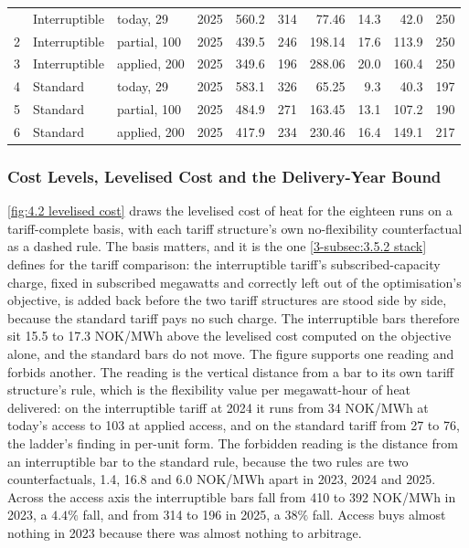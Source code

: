 \begin{table}[htbp]
\begin{tabular}{c l l c r r r r r r}
\addlinespace
1 & Interruptible & today, 29 & 2025 & 560.2 & 314 & 77.46 & 14.3 & 42.0 & 250 \\
2 & Interruptible & partial, 100 & 2025 & 439.5 & 246 & 198.14 & 17.6 & 113.9 & 250 \\
3 & Interruptible & applied, 200 & 2025 & 349.6 & 196 & 288.06 & 20.0 & 160.4 & 250 \\
4 & Standard & today, 29 & 2025 & 583.1 & 326 & 65.25 & 9.3 & 40.3 & 197 \\
5 & Standard & partial, 100 & 2025 & 484.9 & 271 & 163.45 & 13.1 & 107.2 & 190 \\
6 & Standard & applied, 200 & 2025 & 417.9 & 234 & 230.46 & 16.4 & 149.1 & 217 \\
\bottomrule
\end{tabular}
\label{tab:4.2 core results}
\end{table}

\subsubsection{Cost Levels, Levelised Cost and the Delivery-Year Bound}
\label{4-subsec:4.1.2 spot arbitrage}

\autoref{fig:4.2 levelised cost} draws the levelised cost of heat for the eighteen runs on a tariff-complete basis, with each tariff structure's own no-flexibility counterfactual as a dashed rule. The basis matters, and it is the one \autoref{3-subsec:3.5.2 stack} defines for the tariff comparison: the interruptible tariff's subscribed-capacity charge, fixed in subscribed megawatts and correctly left out of the optimisation's objective, is added back before the two tariff structures are stood side by side, because the standard tariff pays no such charge. The interruptible bars therefore sit 15.5 to 17.3 NOK/MWh above the levelised cost computed on the objective alone, and the standard bars do not move. The figure supports one reading and forbids another. The reading is the vertical distance from a bar to its own tariff structure's rule, which is the flexibility value per megawatt-hour of heat delivered: on the interruptible tariff at 2024 it runs from 34 NOK/MWh at today's access to 103 at applied access, and on the standard tariff from 27 to 76, the ladder's finding in per-unit form. The forbidden reading is the distance from an interruptible bar to the standard rule, because the two rules are two counterfactuals, 1.4, 16.8 and 6.0 NOK/MWh apart in 2023, 2024 and 2025. Across the access axis the interruptible bars fall from 410 to 392 NOK/MWh in 2023, a $4.4\%$ fall, and from 314 to 196 in 2025, a $38\%$ fall. Access buys almost nothing in 2023 because there was almost nothing to arbitrage.


